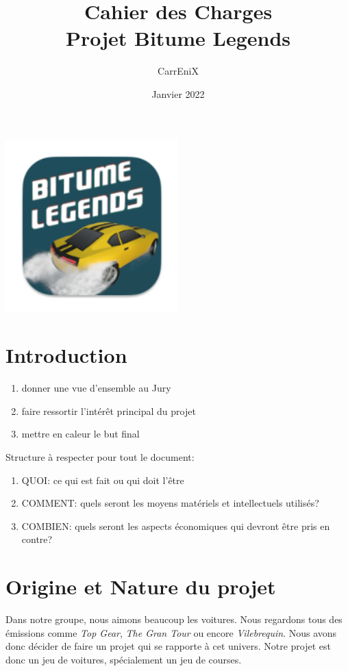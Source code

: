 \documentclass[11pt,a4paper]{article}
\begin{document}
\title{Cahier des Charges \\ Projet Bitume Legends}
\author{CarrEniX}
\date{Janvier 2022}
\maketitle

\begin{center}
    \includegraphics[width=0.5\textwidth]{Medias/logo192.png}
\end{center}

\tableofcontents
\clearpage

\section{Introduction}
  \begin{enumerate}
    \item donner une vue d'ensemble au Jury
    \item faire ressortir l'intérêt principal du projet
    \item mettre en caleur le but final
  \end{enumerate}
  Structure à respecter pour tout le document:
  \begin{enumerate}
    \item QUOI: ce qui est fait ou qui doit l'être
    \item COMMENT: quels seront les moyens matériels et intellectuels utilisés?
    \item COMBIEN: quels seront les aspects économiques qui devront être pris en contre?
  \end{enumerate}
\clearpage

\section{Origine et Nature du projet}
Dans notre groupe, nous aimons beaucoup les voitures. Nous regardons tous des émissions comme 
\emph{Top Gear}, \emph{The Gran Tour} ou encore \emph{Vilebrequin}. Nous avons donc décider de faire
un projet qui se rapporte à cet univers. Notre projet est donc un jeu de voitures, spécialement un jeu
de courses. 
\clearpage
\end{document}
